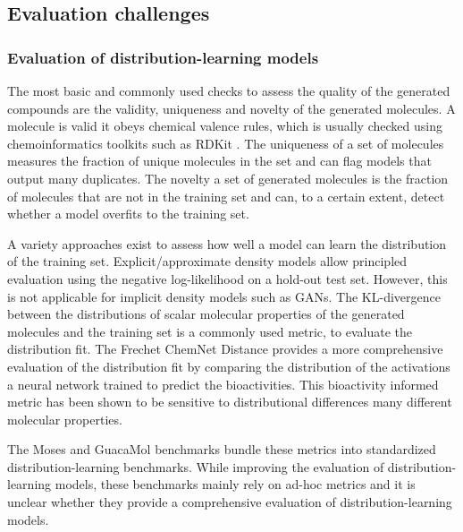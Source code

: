 \subsection{Evaluation challenges}
\subsubsection{Evaluation of distribution-learning models}
The most basic and commonly used checks to assess the quality of the generated compounds are the
validity, uniqueness and novelty of the generated molecules. A molecule is valid it obeys chemical
valence rules, which is usually checked using chemoinformatics toolkits such as RDKit
\citep{landrumRDKitOpensourceCheminformatics2006}. The uniqueness of a set of molecules measures the
fraction of unique molecules in the set and can flag models that output many duplicates. The novelty
a set of generated molecules is the fraction of molecules that are not in the training set and can,
to a certain extent, detect whether a model overfits to the training set.

A variety approaches exist to assess how well a model can learn the distribution of the training
set. Explicit/approximate density models allow principled evaluation using the negative
log-likelihood on a hold-out test set. However, this is not applicable for implicit density models
such as GANs. The KL-divergence between the distributions of scalar molecular properties
of the generated molecules and the training set is a commonly used metric, to evaluate the
distribution fit. The Frechet ChemNet Distance \citep{preuerFrechetChemNetDistance2018} provides a more
comprehensive evaluation of the distribution fit by comparing the distribution of the activations a
neural network trained to predict the bioactivities. This bioactivity informed metric has been shown
to be sensitive to distributional differences many different molecular properties.

The Moses \citep{polykovskiyMolecularSetsMOSES2020} and GuacaMol
\citep{brownGuacaMolBenchmarkingModels2019} benchmarks bundle these metrics into standardized
distribution-learning benchmarks. While improving the evaluation of distribution-learning
models, these benchmarks mainly rely on ad-hoc metrics and it is unclear
whether they provide a comprehensive evaluation of distribution-learning models.

